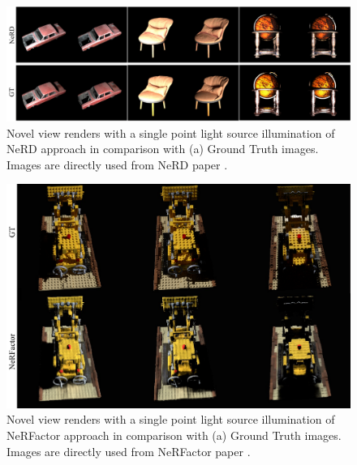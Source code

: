 \begin{figure}[!htb]
    \centering
    \includegraphics[width=\textwidth]{figures/concurrent/nerd.png}
    \caption{Novel view renders with a single point light source illumination of NeRD approach \cite{boss2020nerd}
    in comparison with (a) Ground Truth images.
    Images are directly used from NeRD paper \cite{boss2020nerd}.
    }
    \label{fig:concur_nerd}
\end{figure}

\begin{figure}[!htb]
    \centering
    \includegraphics[width=\textwidth]{figures/concurrent/nerfactor_3_75percent.png}
    \caption{Novel view renders with a single point light source illumination of NeRFactor approach \cite{nerfactor}
    in comparison with (a) Ground Truth images.
    Images are directly used from NeRFactor paper \cite{nerfactor}.
    }
    \label{fig:concur_nerfactor1}
\end{figure}

